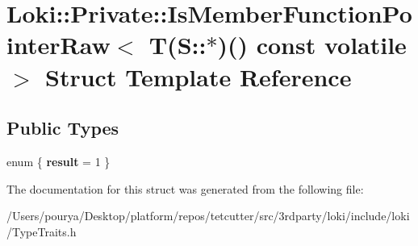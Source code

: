 \hypertarget{structLoki_1_1Private_1_1IsMemberFunctionPointerRaw_3_01T_07S_1_1_5_08_07_08_01const_01volatile_01_4}{}\section{Loki\+:\+:Private\+:\+:Is\+Member\+Function\+Pointer\+Raw$<$ T(S\+:\+:$\ast$)() const volatile $>$ Struct Template Reference}
\label{structLoki_1_1Private_1_1IsMemberFunctionPointerRaw_3_01T_07S_1_1_5_08_07_08_01const_01volatile_01_4}
\subsection*{Public Types}
\begin{DoxyCompactItemize}
\item 
\hypertarget{structLoki_1_1Private_1_1IsMemberFunctionPointerRaw_3_01T_07S_1_1_5_08_07_08_01const_01volatile_01_4_aaa80b3c1a5936faca5e797abcf9fb9b6}{}enum \{ {\bfseries result} = 1
 \}\label{structLoki_1_1Private_1_1IsMemberFunctionPointerRaw_3_01T_07S_1_1_5_08_07_08_01const_01volatile_01_4_aaa80b3c1a5936faca5e797abcf9fb9b6}

\end{DoxyCompactItemize}


The documentation for this struct was generated from the following file\+:\begin{DoxyCompactItemize}
\item 
/\+Users/pourya/\+Desktop/platform/repos/tetcutter/src/3rdparty/loki/include/loki/Type\+Traits.\+h\end{DoxyCompactItemize}
